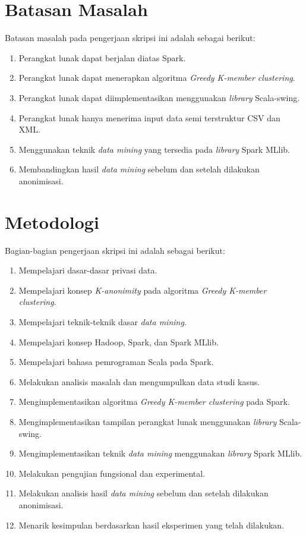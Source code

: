 \section{Batasan Masalah}
\label{sec:batasan}
Batasan masalah pada pengerjaan skripsi ini adalah sebagai berikut:
\begin{enumerate}
\item Perangkat lunak dapat berjalan diatas Spark.
\item Perangkat lunak dapat menerapkan algoritma {\it Greedy K-member clustering}.
\item Perangkat lunak dapat diimplementasikan menggunakan {\it library} Scala-swing.
\item Perangkat lunak hanya menerima input data semi terstruktur CSV dan XML.
\item Menggunakan teknik {\it data mining} yang tersedia pada {\it library} Spark MLlib.
\item Membandingkan hasil {\it data mining} sebelum dan setelah dilakukan anonimisasi.
\end{enumerate}

\section{Metodologi}
\label{sec:metlit}
Bagian-bagian pengerjaan skripsi ini adalah sebagai berikut:
\begin{enumerate}
\item Mempelajari dasar-dasar privasi data.
\item Mempelajari konsep {\it K-anonimity} pada algoritma {\it Greedy K-member clustering}.
\item Mempelajari teknik-teknik dasar {\it data mining}.
\item Mempelajari konsep Hadoop, Spark, dan Spark MLlib.
\item Mempelajari bahasa pemrograman Scala pada Spark.
\item Melakukan analisis masalah dan mengumpulkan data studi kasus.
\item Mengimplementasikan algoritma {\it Greedy K-member clustering } pada Spark.
\item Mengimplementasikan tampilan perangkat lunak menggunakan {\it library} Scala-swing.
\item Mengimplementasikan teknik {\it data mining} menggunakan {\it library} Spark MLlib.
\item Melakukan pengujian fungsional dan experimental.
\item Melakukan analisis hasil {\it data mining} sebelum dan setelah dilakukan anonimisasi.
\item Menarik kesimpulan berdasarkan hasil eksperimen yang telah dilakukan.
\end{enumerate}

